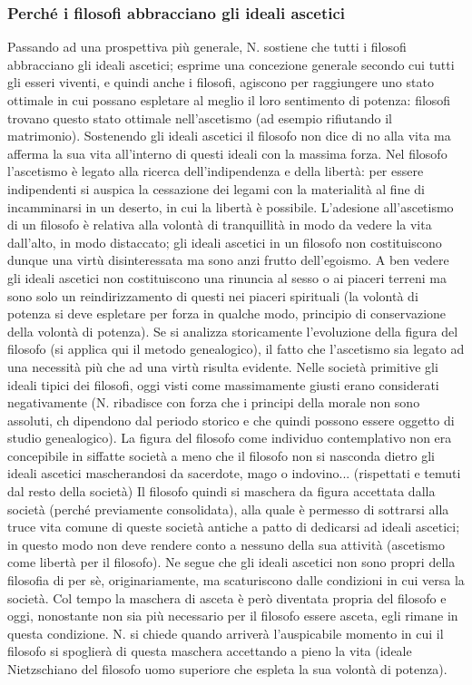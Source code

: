 \documentclass[10pt,a4paper]{article}
\begin{document}
\subsubsection{Perché i filosofi abbracciano gli ideali ascetici}
Passando ad una prospettiva più generale, N. sostiene che tutti i filosofi abbracciano gli ideali ascetici; esprime una concezione generale secondo cui tutti gli esseri viventi, e quindi anche i filosofi, agiscono per raggiungere uno stato ottimale in cui possano espletare al meglio il loro sentimento di potenza:  filosofi trovano questo stato ottimale nell'ascetismo (ad esempio rifiutando il matrimonio). Sostenendo gli ideali ascetici il filosofo non dice di no alla vita ma afferma la sua vita all'interno di questi ideali con la massima forza. Nel filosofo l'ascetismo è legato alla ricerca dell'indipendenza e della libertà: per essere indipendenti si auspica la cessazione dei legami con la materialità al fine di incamminarsi in un deserto, in cui la libertà è possibile. L'adesione all'ascetismo di un filosofo è relativa alla volontà di tranquillità in modo da vedere la vita dall'alto, in modo distaccato; gli ideali ascetici in un filosofo non costituiscono dunque una virtù disinteressata ma sono anzi frutto dell'egoismo. A ben vedere gli ideali ascetici non costituiscono una rinuncia al sesso o ai piaceri terreni ma sono solo un reindirizzamento di questi nei piaceri spirituali (la volontà di potenza si deve espletare per forza in qualche modo, principio di conservazione della volontà di potenza). Se si analizza storicamente l'evoluzione della figura del filosofo (si applica qui il metodo genealogico), il fatto che l'ascetismo sia legato ad una necessità più che ad una virtù risulta evidente. Nelle società primitive gli ideali tipici dei filosofi, oggi visti come massimamente giusti erano considerati negativamente (N. ribadisce con forza che i principi della morale non sono assoluti, ch dipendono dal periodo storico e che quindi possono essere oggetto di studio genealogico). La figura del filosofo come individuo contemplativo non era concepibile in siffatte società a meno che il filosofo non si nasconda dietro gli ideali ascetici mascherandosi da sacerdote, mago o indovino... (rispettati e temuti dal resto della società) Il filosofo quindi si maschera da figura accettata dalla società (perché previamente consolidata), alla quale è permesso di sottrarsi alla truce vita comune di queste società antiche a patto di dedicarsi ad ideali ascetici; in questo modo non deve rendere conto a nessuno della sua attività (ascetismo come libertà per il filosofo). Ne segue che gli ideali ascetici non sono propri della filosofia di per sè, originariamente, ma scaturiscono dalle condizioni in cui versa la società. Col tempo la maschera di asceta è però diventata propria del filosofo e oggi, nonostante non sia più necessario per il filosofo essere asceta, egli rimane in questa condizione.  N. si chiede quando arriverà l'auspicabile momento in cui il filosofo si spoglierà di questa maschera accettando a pieno la vita (ideale Nietzschiano del filosofo uomo superiore che espleta la sua volontà di potenza).
\end{document}
